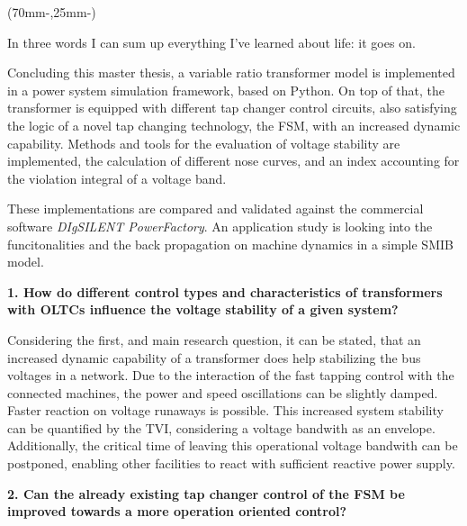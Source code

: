 \begin{textblock*}{.7\textwidth}(70mm-\offset,25mm-\offset)
    \begin{fquote}
        In three words I can sum up everything I've learned about life: it goes on.
    \end{fquote}
\end{textblock*}

Concluding this master thesis, a variable ratio transformer model is implemented in a power system simulation framework, based on Python.
On top of that, the transformer is equipped with different tap changer control circuits, also satisfying the logic of a novel tap changing technology, the \acf{FSM}, with an increased dynamic capability.
Methods and tools for the evaluation of voltage stability are implemented, the calculation of different nose curves, and an index accounting for the violation integral of a voltage band.

These implementations are compared and validated against the commercial software \textit{DIgSILENT PowerFactory}.
An application study is looking into the funcitonalities and the back propagation on machine dynamics in a simple \acf{SMIB} model.

\textbf{1. How do different control types and characteristics of transformers with \acfp{OLTC} influence the voltage stability of a given system?}

Considering the first, and main research question, it can be stated, that an increased dynamic capability of a transformer does help stabilizing the bus voltages in a network.
Due to the interaction of the fast tapping control with the connected machines, the power and speed oscillations can be slightly damped.
Faster reaction on voltage runaways is possible.
This increased system stability can be quantified by the \acf{TVI}, considering a voltage bandwith as an envelope.
Additionally, the critical time of leaving this operational voltage bandwith can be postponed, enabling other facilities to react with sufficient reactive power supply.

\textbf{2. Can the already existing tap changer control of the \acf{FSM} be improved towards a more operation oriented control?}


